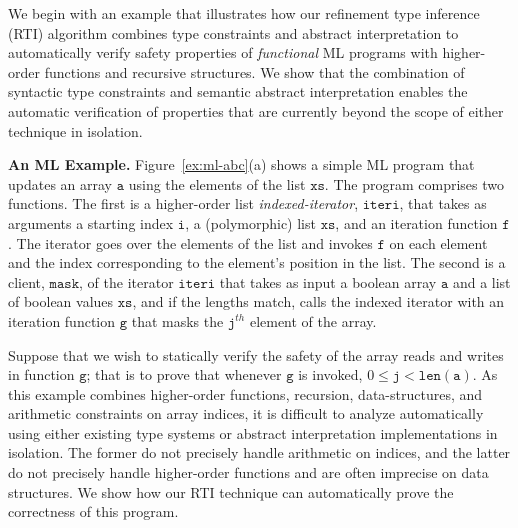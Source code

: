 \documentclass[nocopyrightspace]{sigplanconf}
\def\mypara#1{\smallskip\noindent\textbf{#1}}
\newcommand\ML{\textsc{ML}\xspace}
\newcommand\HMC{\textsc{RTI}\xspace}
\newcommand{\ttf}{\mathtt{f}}
\newcommand{\ttg}{\mathtt{g}}
\newcommand{\ttxs}{\mathtt{xs}}
\newcommand{\tta}{\mathtt{a}}
\newcommand{\tti}{\mathtt{i}}
\newcommand{\ttj}{\mathtt{j}}
\newcommand{\ttiteri}{\mathtt{iteri}}
\newcommand{\ttmask}{\mathtt{mask}}
\def\ttxs{\mathtt{xs}}
\newcommand{\ttlena}{{\ttlen}\xspace}
\newcommand{\ttlen}{\mathtt{len}}
\begin{document}
We begin with an example that illustrates how our refinement
type inference (\HMC) algorithm combines type
constraints and abstract interpretation to automatically verify safety properties of
\emph{functional} \ML programs with higher-order functions and 
recursive structures.
We show that the combination of syntactic type constraints
and semantic abstract interpretation enables the automatic verification of properties
that are currently beyond the scope of either technique in isolation.

\mypara{An \ML Example. }
Figure~\ref{ex:ml-abc}(a) shows a simple ML program that 
updates an array $\tta$ using the elements of the list $\ttxs$. 
The program comprises two functions. 
The first is a higher-order list \emph{indexed-iterator}, $\ttiteri$,
that takes as arguments a starting index $\tti$, 
a (polymorphic) list $\ttxs$, 
and an iteration function $\ttf$. 
The iterator goes over the elements of the list and invokes $\ttf$ on each element
and the index corresponding to the element's position in the list.
The second is a client, $\ttmask$, of the iterator $\ttiteri$ that takes as input a
boolean array $\tta$ and a list of boolean values $\ttxs$, and if the
lengths match, calls the indexed iterator with an iteration function $\ttg$ 
that masks the $\ttj^{th}$ element of the array.

Suppose that we wish to statically verify the safety of the array reads and writes 
in function $\ttg$; that is to prove that whenever $\ttg$ is invoked, 
$0 \leq \ttj < \ttlena(\tta)$.
As this example combines higher-order functions, recursion, data-structures, and
arithmetic constraints on array indices, it is difficult to analyze automatically 
using either existing type systems or abstract interpretation implementations in isolation.
The former do not precisely handle arithmetic on indices, and the latter
do not precisely handle higher-order functions and are often imprecise on
data structures.
We show how our \HMC technique can automatically prove the correctness 
of this program.
\end{document}

